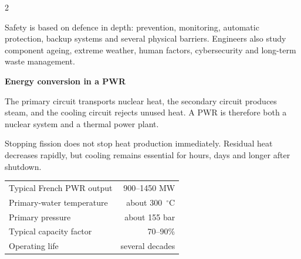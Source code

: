 \begin{multicols}{2}
\begin{ecarticle}
Safety is based on defence in depth: prevention, monitoring, automatic protection, backup
systems and several physical barriers. Engineers also study component ageing, extreme
weather, human factors, cybersecurity and long-term waste management.
\end{ecarticle}

\columnbreak

\begin{engineeringfocus}
\textbf{Energy conversion in a PWR}

\begin{center}
\end{center}

The primary circuit transports nuclear heat, the secondary circuit produces steam, and the
cooling circuit rejects unused heat. A PWR is therefore both a nuclear system and a thermal
power plant.
\end{engineeringfocus}

\begin{tcolorbox}[title=\sffamily\bfseries Did You Know?,colback=yellow!10,colframe=ECOrange]
Stopping fission does not stop heat production immediately. Residual heat decreases rapidly,
but cooling remains essential for hours, days and longer after shutdown.
\end{tcolorbox}

\begin{tcolorbox}[title=\sffamily\bfseries Key Figures,colback=ECLightBlue,colframe=ECBlue]
\begin{tabularx}{\linewidth}{@{}Xr@{}}
Typical French PWR output & 900--1450 MW\\
Primary-water temperature & about 300~$^{\circ}$C\\
Primary pressure & about 155 bar\\
Typical capacity factor & 70--90\%\\
Operating life & several decades
\end{tabularx}
\end{tcolorbox}


\end{multicols}

